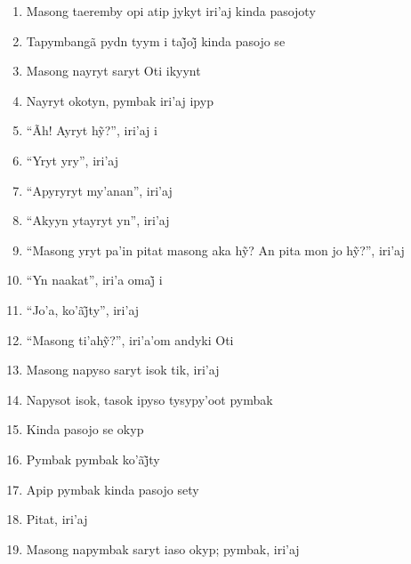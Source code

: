 \begin{enumerate}
 \item Masong taeremby opi atip jykyt iri'aj kinda pasojoty

 \item Tapymbangã pydn tyym i taj̃oj̃ kinda pasojo se

 \item Masong nayryt saryt Oti ikyynt

 \item Nayryt okotyn, pymbak iri'aj ipyp

 \begin{center}\end{center}

 \item ``Ãh! Ayryt hỹ?'', iri’aj i

 \item ``Yryt yry'', iri'aj

 \item ``Apyryryt my'anan'', iri'aj

 \item ``Akyyn ytayryt yn'', iri'aj

 \item ``Masong yryt pa’in pitat masong aka hỹ? An pita mon jo hỹ?'', iri’aj

 \item ``Yn naakat'', iri’a omaj̃ i

 \item ``Jo’a, ko’ãj̃ty'', iri’aj

 \item ``Masong ti’ahỹ?'', iri’a’om andyki Oti

 \begin{center}\end{center}

 \item Masong napyso saryt isok tik, iri'aj

 \item Napysot isok, tasok ipyso tysypy'oot pymbak

 \item Kinda pasojo se okyp

 \item Pymbak pymbak ko’ãj̃ty

 \item Apip pymbak kinda pasojo sety

 \item Pitat, iri'aj

 \item Masong napymbak saryt iaso okyp; pymbak, iri'aj


\end{enumerate}
